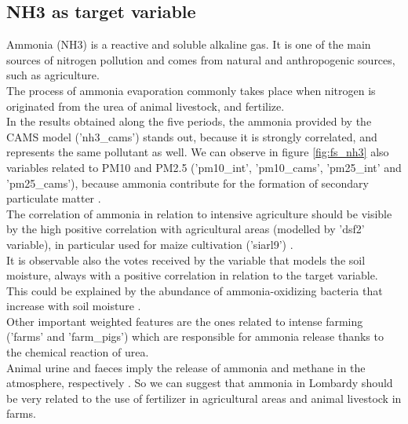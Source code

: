 \subsection{NH3 as target variable}
Ammonia (NH3) is a reactive and soluble alkaline gas. It is one of the main sources of nitrogen pollution and comes from natural and anthropogenic sources, such as agriculture.\\
The process of ammonia evaporation commonly takes place when nitrogen is originated from the urea of animal livestock, and fertilize. \\
In the results obtained along the five periods, the ammonia provided by the CAMS model ('nh3\_cams') stands out, because it is strongly correlated, and represents the same pollutant as well.
We can observe in figure \ref{fig:fs_nh3} also variables related to PM10 and PM2.5 ('pm10\_int', 'pm10\_cams', 'pm25\_int' and 'pm25\_cams'), because ammonia contribute for the formation of secondary particulate matter \cite{dai2019concentrations} \cite{zhu2015sources}.\\
The correlation of ammonia in relation to intensive agriculture should be visible by the high positive correlation with agricultural areas (modelled by 'dsf2' variable), in particular used for maize cultivation ('siarl9') .\\
It is observable also the votes received by the variable that models the soil moisture, always with a positive correlation in relation to the target variable. This could be explained by the abundance of ammonia-oxidizing bacteria that increase with soil moisture \cite{avrahami2007response}.  \\
Other important weighted features are the ones related to intense farming ('farms' and 'farm\_pigs') which are responsible for ammonia release thanks to the chemical reaction of urea.\\
Animal urine and faeces imply the release of ammonia and methane in the atmosphere, respectively \cite{saggar2004review}.
So we can suggest that ammonia in Lombardy should be very related to the use of fertilizer in agricultural areas and animal livestock in farms.
\bigbreak
\pagebreak
\clearpage
